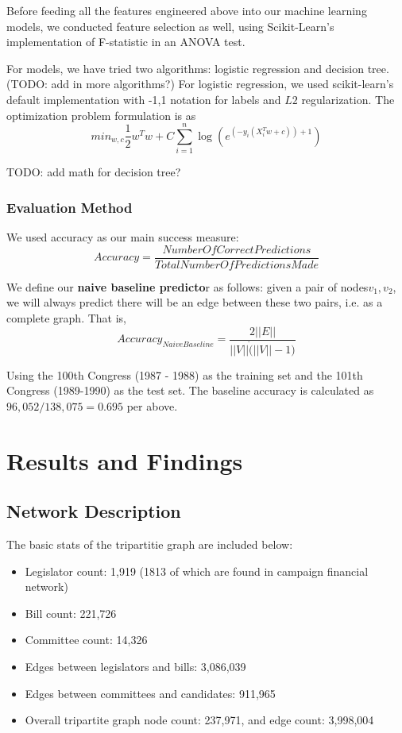 \documentclass[12pt,twocolumn]{article}
\begin{document}
Before feeding all the features engineered above into our machine learning models, we conducted feature selection as well, using Scikit-Learn's implementation of F-statistic in an ANOVA test. 

For models, we have tried two algorithms: logistic regression and decision tree. (TODO: add in more algorithms?) For logistic regression, we used scikit-learn's \cite{scikit-learn} default implementation with {-1,1} notation for labels and $L2$ regularization. The optimization problem formulation is as $$min_{w,c} \frac{1}{2} w^Tw + C \sum_{i = 1}^{n} \log (e^{(-y_i (X^T_i w + c)) + 1})$$

TODO: add math for decision tree?

\subsubsection{Evaluation Method}
We used accuracy as our main success measure: $$Accuracy = \frac{NumberOfCorrectPredictions}{TotalNumberOfPredictionsMade}$$

We define our \textbf{naive baseline predicto}r as follows: given a pair of nodes$v_1, v_2$, we will always predict there will be an edge between these two pairs, i.e. as a complete graph. That is, $$Accuracy_{Naive Baseline} = \frac{2||E||}{||V|| \dot (||V|| - 1)} $$

Using the 100th Congress (1987 - 1988) as the training set and the 101th Congress (1989-1990) as the test set.  The baseline accuracy is calculated as $96,052/138,075= 0.695$ per above. 

\section{Results and Findings}
\subsection{Network Description}
The basic stats of the tripartitie graph are included below: 
\begin{itemize}
\item Legislator count: 1,919 (1813 of which are found in campaign financial network)
\item Bill count: 221,726 
\item Committee count: 14,326
\item Edges between legislators and bills: 3,086,039
\item Edges between committees and candidates: 911,965
\item Overall tripartite graph node count: 237,971, and edge count: 3,998,004
\end{itemize}
\end{document}
